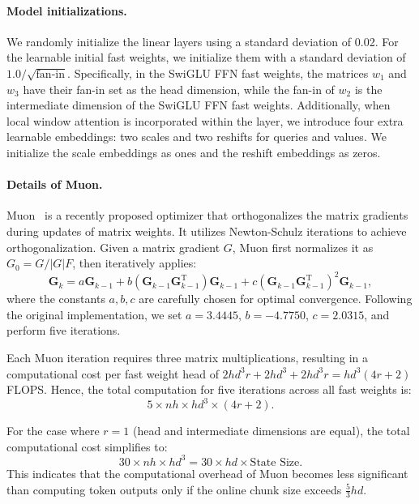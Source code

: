 \documentclass{article}
\begin{document}
\paragraph{Model initializations.} We randomly initialize the linear layers using a standard deviation of 0.02. For the learnable initial fast weights, we initialize them with a standard deviation of $1.0 / \sqrt{\text{fan-in}}$. Specifically, in the SwiGLU FFN fast weights, the matrices $w_1$ and $w_3$ have their fan-in set as the head dimension, while the fan-in of $w_2$ is the intermediate dimension of the SwiGLU FFN fast weights. Additionally, when local window attention is incorporated within the \methodname{} layer, we introduce four extra learnable embeddings: two scales and two reshifts for queries and values. We initialize the scale embeddings as ones and the reshift embeddings as zeros.

\paragraph{Details of Muon.} Muon~\cite{jordan2024muon} is a recently proposed optimizer that orthogonalizes the matrix gradients during updates of matrix weights. It utilizes Newton-Schulz iterations to achieve orthogonalization. Given a matrix gradient $G$, Muon first normalizes it as $G_0 = G / |G|F$, then iteratively applies:
\begin{equation}
\mathbf{G}_k = a\mathbf{G}_{k-1} + b(\mathbf{G}_{k-1}\mathbf{G}_{k-1}^{\mathrm{T}})\mathbf{G}_{k-1} + c(\mathbf{G}_{k-1}\mathbf{G}_{k-1}^{\mathrm{T}})^2\mathbf{G}_{k-1},
\label{eq:muon_iteration}
\end{equation}
where the constants $a, b, c$ are carefully chosen for optimal convergence. Following the original implementation, we set $a=3.4445$, $b=-4.7750$, $c=2.0315$, and perform five iterations.

Each Muon iteration requires three matrix multiplications, resulting in a computational cost per fast weight head of $2 \mathit{hd}^3 r + 2 \mathit{hd}^3 + 2 \mathit{hd}^3 r = \mathit{hd}^3 (4r + 2)$ FLOPS. Hence, the total computation for five iterations across all fast weights is:
\begin{equation}
5 \times \mathit{nh} \times \mathit{hd}^3 \times (4r + 2).
\end{equation}

For the case where $r=1$ (head and intermediate dimensions are equal), the total computational cost simplifies to:
\begin{equation}
30 \times \mathit{nh} \times \mathit{hd}^3 = 30 \times \mathit{hd} \times \text{State Size}.
\end{equation}
This indicates that the computational overhead of Muon becomes less significant than computing token outputs only if the online chunk size exceeds $\frac{5}{3} \mathit{hd}$.
\end{document}
